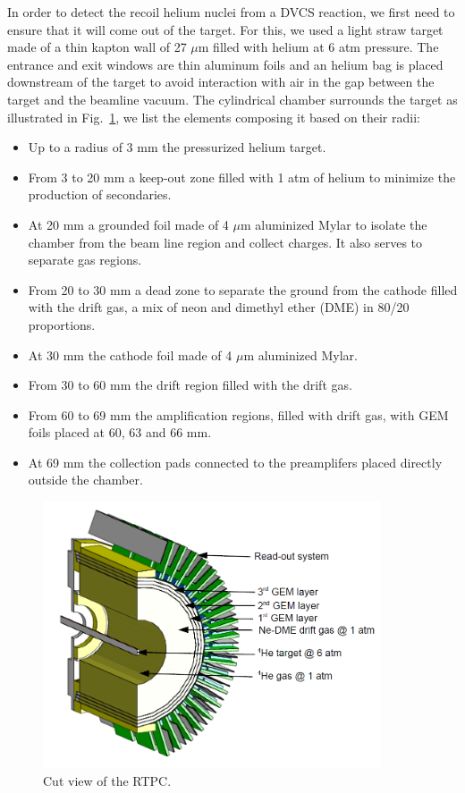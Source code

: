 \documentclass{article}
\begin{document}
In order to detect the recoil helium nuclei from a DVCS reaction, we first need 
to ensure that it will come out of the target. For this, we used a light straw 
target made of a thin kapton wall of 27 $\mu$m filled with helium at 6 atm 
pressure. The entrance and exit windows are thin aluminum foils and an helium 
bag is placed downstream of the target to avoid interaction with air in the gap 
between the target and the beamline vacuum. The cylindrical 
chamber surrounds the target as illustrated in Fig.~\ref{fig:RTPCGlobal}, we 
list the elements composing it based on their radii:
\begin{itemize}
	\item Up to a radius of 3 mm the pressurized helium target.
	\item From 3 to 20 mm a keep-out zone filled with 1 atm of helium to 
		minimize the production of secondaries. 
	\item At 20 mm a grounded foil made of 4 $\mu$m aluminized Mylar to 
		isolate the chamber from the beam line 
		region and collect charges. It also serves to separate gas regions.
	\item From 20 to 30 mm a dead zone to separate the ground from the cathode
		filled with the drift gas, a mix of neon and dimethyl ether (DME) in 
		80/20 proportions.
	\item At 30 mm the cathode foil made of 4 $\mu$m aluminized Mylar.
	\item From 30 to 60 mm the drift region filled with the drift gas.
	\item From 60 to 69 mm the amplification regions, filled with drift gas, 
		with GEM foils placed at 60, 63 and 66 mm.
	\item At 69 mm the collection pads connected to the preamplifers placed 
		directly outside the chamber.
\end{itemize}

\begin{figure}[tbp!]
\center
\includegraphics[width=10cm]{fig3/RTPC_new_1.png}
\caption{Cut view of the RTPC.}
\label{fig:RTPCGlobal}
\end{figure}
\end{document}
